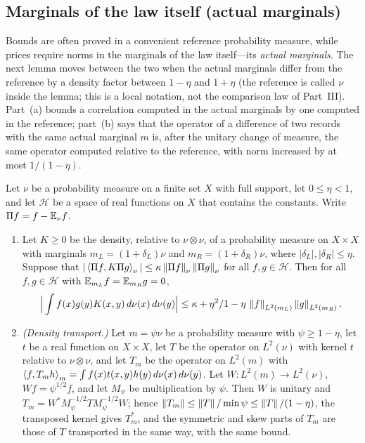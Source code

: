\subsection{Marginals of the law itself (actual marginals)}\label{subsec:cuts:actual}

Bounds are often proved in a convenient reference probability
measure, while prices require norms in the marginals of the law
itself---its \emph{actual marginals}. The next lemma moves between
the two when the actual marginals differ from the reference by a
density factor between $1-\eta$ and $1+\eta$ (the reference is
called $\nu$ inside the lemma; this is a local notation, not the
comparison law of Part~III). Part~(a) bounds a correlation
computed in the actual marginals by one computed in the reference;
part~(b) says that the operator of a difference of two records
with the same actual marginal $m$ is, after the unitary change of
measure, the same operator computed relative to the reference,
with norm increased by at most $1/(1-\eta)$.

\begin{lemma}\label{lem:record:actual-correlation}
Let $\nu$ be a probability measure on a finite set $X$ with full support, let
$0\le\eta<1$, and let $\mathcal H$ be a space of real functions on $X$ that
contains the constants. Write $\Pi f=f-\mathbb E_\nu f$.
\begin{enumerate}[label=\textup{(\alph*)}]
\item Let $K\ge0$ be the density, relative to $\nu\otimes\nu$, of a probability
  measure on $X\times X$ with marginals $m_L=(1+\delta_L)\nu$ and
  $m_R=(1+\delta_R)\nu$, where $|\delta_L|,|\delta_R|\le\eta$. Suppose that
  $|\left\langle \Pi f,K\Pi g\right\rangle_\nu|\le\kappa\left\|\Pi f\right\|_\nu\left\|\Pi g\right\|_\nu$ for all
  $f,g\in\mathcal H$. Then for all $f,g\in\mathcal H$ with
  $\mathbb E_{m_L}f=\mathbb E_{m_R}g=0$,
  \[
    \Big|\int f(x)g(y)K(x,y)\,d\nu(x)\,d\nu(y)\Big|\le\kappa+\eta^2/1-\eta
    \,\left\|f\right\|_{L^2(m_L)}\left\|g\right\|_{L^2(m_R)} .
  \]
\item \emph{(Density transport.)} Let $m=\psi\nu$ be a probability measure with
  $\psi\ge1-\eta$, let $t$ be a real function on $X\times X$, let $T$ be the
  operator on $L^2(\nu)$ with kernel $t$ relative to $\nu\otimes\nu$, and let
  $T_m$ be the operator on $L^2(m)$ with
  $\left\langle f,T_mh\right\rangle_m=\int f(x)t(x,y)h(y)\,d\nu(x)\,d\nu(y)$. Let $W\colon L^2(m)\to
  L^2(\nu)$, $Wf=\psi^{1/2}f$, and let $M_\psi$ be multiplication by $\psi$.
  Then $W$ is unitary and $T_m=W^*M_\psi^{-1/2}TM_\psi^{-1/2}W$; hence
  $\left\|T_m\right\|\le\left\|T\right\|/\min\psi\le\left\|T\right\|/(1-\eta)$, the transposed kernel
  gives $T_m^*$, and the symmetric and skew parts of $T_m$ are those of $T$
  transported in the same way, with the same bound.
\end{enumerate}
\end{lemma}

